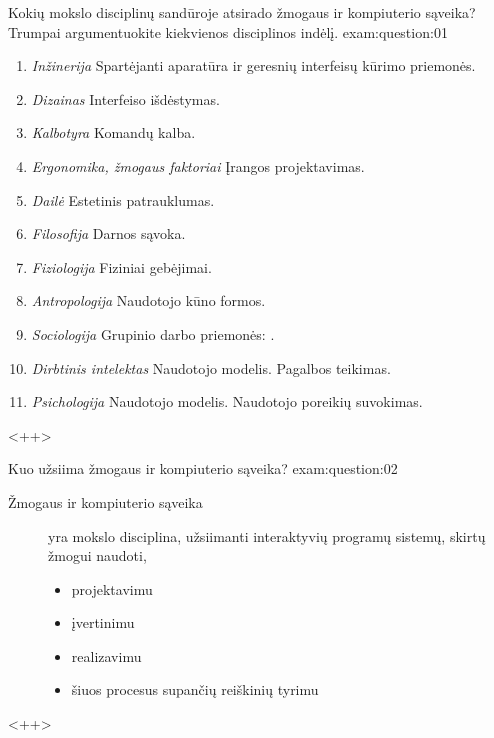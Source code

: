 
\begin{question}{%
  Kokių mokslo disciplinų sandūroje atsirado žmogaus ir kompiuterio
  sąveika? Trumpai argumentuokite kiekvienos disciplinos indėlį.
  }{exam:question:01}
  \begin{enumerate}
    \item \emph{Inžinerija} Spartėjanti aparatūra ir geresnių interfeisų kūrimo priemonės.
    \item \emph{Dizainas} Interfeiso išdėstymas.
    \item \emph{Kalbotyra} Komandų kalba.
    \item \emph{Ergonomika, žmogaus faktoriai} Įrangos projektavimas.
    \item \emph{Dailė} Estetinis patrauklumas.
    \item \emph{Filosofija} Darnos sąvoka.
    \item \emph{Fiziologija} Fiziniai gebėjimai.
    \item \emph{Antropologija} Naudotojo kūno formos.
    \item \emph{Sociologija} Grupinio darbo priemonės: .
    \item \emph{Dirbtinis intelektas} Naudotojo modelis. Pagalbos teikimas.
    \item \emph{Psichologija} Naudotojo modelis. Naudotojo poreikių suvokimas.
  \end{enumerate}
  <++>
\end{question}

\begin{question}{%
  Kuo užsiima žmogaus ir kompiuterio sąveika?
  }{exam:question:02}
  \begin{description}
    \item[Žmogaus ir kompiuterio sąveika] yra mokslo disciplina, užsiimanti
      interaktyvių programų sistemų, skirtų žmogui naudoti,
      \begin{itemize}
        \item{projektavimu}
        \item{įvertinimu}
        \item{realizavimu}
        \item{šiuos procesus supančių reiškinių tyrimu}
      \end{itemize}
  \end{description}
  <++>
\end{question}

